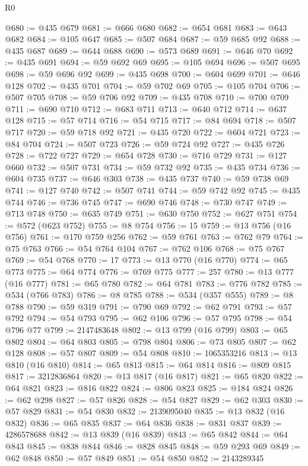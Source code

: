 \begin{lexlean}{R0}
\begin{coremodule}
@680 := @435 @679
@681 := @666 @680
@682 := @654 @681
@683 := @643 @682
@684 := @105 @647
@685 := @507 @684
@687 := @59 @685 @92
@688 := @435 @687
@689 := @644 @688
@690 := @573 @689
@691 := @646 @70
@692 := @435 @691
@694 := @59 @692 @69
@695 := @105 @694
@696 := @507 @695
@698 := @59 @696 @92
@699 := @435 @698
@700 := @604 @699
@701 := @646 @128
@702 := @435 @701
@704 := @59 @702 @69
@705 := @105 @704
@706 := @507 @705
@708 := @59 @706 @92
@709 := @435 @708
@710 := @700 @709
@711 := @690 @710
@712 := @683 @711
@713 := @640 @712
@714 := @637 @128
@715 := @57 @714
@716 := @54 @715
@717 := @84 @694
@718 := @507 @717
@720 := @59 @718 @92
@721 := @435 @720
@722 := @604 @721
@723 := @84 @704
@724 := @507 @723
@726 := @59 @724 @92
@727 := @435 @726
@728 := @722 @727
@729 := @654 @728
@730 := @716 @729
@731 := @127 @660
@732 := @507 @731
@734 := @59 @732 @92
@735 := @435 @734
@736 := @604 @735
@737 := @646 @303
@738 := @435 @737
@740 := @59 @738 @69
@741 := @127 @740
@742 := @507 @741
@744 := @59 @742 @92
@745 := @435 @744
@746 := @736 @745
@747 := @690 @746
@748 := @730 @747
@749 := @713 @748
@750 := @635 @749
@751 := @630 @750
@752 := @627 @751
@754 := @572 (@623 @752)
@755 := @8 @754
@756 := 15
@759 := @13 @756 (@16 @756)
@761 := @170 @759 @256
@762 := @59 @761
@763 := @762 @79
@764 := @75 @763
@766 := @54 @764 @104
@767 := @762 @106
@768 := @75 @767
@769 := @54 @768
@770 := 17
@773 := @13 @770 (@16 @770)
@774 := @65 @773
@775 := @64 @774
@776 := @769 @775
@777 := 257
@780 := @13 @777 (@16 @777)
@781 := @65 @780
@782 := @64 @781
@783 := @776 @782
@785 := @534 (@766 @783)
@786 := @8 @785
@788 := @534 (@357 @555)
@789 := @8 @788
@790 := @59 @319
@791 := @790 @69
@792 := @62 @791
@793 := @57 @792
@794 := @54 @793
@795 := @62 @106
@796 := @57 @795
@798 := @54 @796 @77
@799 := 2147483648
@802 := @13 @799 (@16 @799)
@803 := @65 @802
@804 := @64 @803
@805 := @798 @804
@806 := @73 @805
@807 := @62 @128
@808 := @57 @807
@809 := @54 @808
@810 := 1065353216
@813 := @13 @810 (@16 @810)
@814 := @65 @813
@815 := @64 @814
@816 := @809 @815
@817 := 3212836864
@820 := @13 @817 (@16 @817)
@821 := @65 @820
@822 := @64 @821
@823 := @816 @822
@824 := @806 @823
@825 := @184 @824
@826 := @62 @298
@827 := @57 @826
@828 := @54 @827
@829 := @62 @303
@830 := @57 @829
@831 := @54 @830
@832 := 2139095040
@835 := @13 @832 (@16 @832)
@836 := @65 @835
@837 := @64 @836
@838 := @831 @837
@839 := 4286578688
@842 := @13 @839 (@16 @839)
@843 := @65 @842
@844 := @64 @843
@845 := @838 @844
@846 := @828 @845
@848 := @59 @293 @69
@849 := @62 @848
@850 := @57 @849
@851 := @54 @850
@852 := 2143289345

\end{coremodule}
\end{lexlean}
